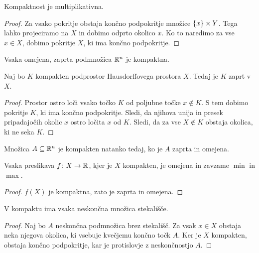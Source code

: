 \begin{izrek}
Kompaktnost je multiplikativna.
\end{izrek}

\begin{proof}
Za vsako pokritje obstaja končno podpokritje množice
$\left\{x\right\} \times Y$. Tega lahko projeciramo na $X$ in dobimo odprto
okolico $x$. Ko to naredimo za vse $x \in X$, dobimo pokritje $X$,
ki ima končno podpokritje.
\end{proof}

\begin{posledica}
Vsaka omejena, zaprta podmnožica $\mathbb{R}^n$ je kompaktna.
\end{posledica}

\begin{trditev}
Naj bo $K$ kompakten podprostor Hausdorffovega prostora $X$. Tedaj
je $K$ zaprt v $X$.
\end{trditev}

\begin{proof}
Prostor ostro loči vsako točko $K$ od poljubne točke
$x \not \in K$. S tem dobimo pokritje $K$, ki ima končno
podpokritje. Sledi, da njihova unija in presek pripadajočih okolic
$x$ ostro ločita $x$ od $K$. Sledi, da za vse $X \not \in K$
obstaja okolica, ki ne seka $K$.
\end{proof}

\begin{izrek}
Množica $A \subseteq \mathbb{R}^n$ je kompakten natanko tedaj, ko je $A$
zaprta in omejena.
\end{izrek}

\begin{posledica}
Vsaka preslikava $f \colon X \to \mathbb{R}$, kjer je $X$ kompakten, je
omejena in zavzame $\min$ in $\max$.
\end{posledica}

\begin{proof}
$f(X)$ je kompaktna, zato je zaprta in omejena.
\end{proof}

\begin{trditev}
V kompaktu ima vsaka neskončna množica stekališče.
\end{trditev}

\begin{proof}
Naj bo $A$ neskončna podmnožica brez stekališč. Za vsak $x \in X$
obstaja neka njegova okolica, ki vsebuje kvečjemu končno točk $A$.
Ker je $X$ kompakten, obstaja končno podpokritje, kar je
protislovje z neskončnostjo $A$.
\end{proof}

